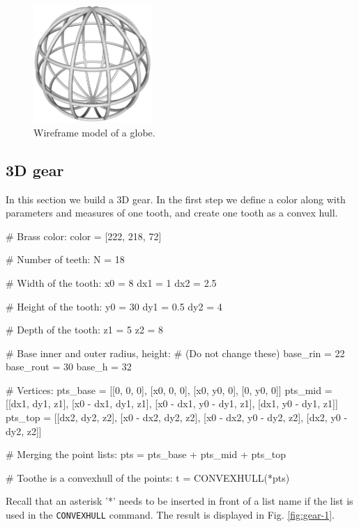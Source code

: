 \begin{figure}[!ht]
\begin{center}
\includegraphics[width=0.4\textwidth]{img/globe.png}
\end{center}
\vspace{-4mm}
\caption{Wireframe model of a globe.}
\label{fig:globe}
\vspace{-1cm}
\end{figure}

\newpage

\subsection{3D gear}

In this section we build a 3D gear. In the first step we define 
a color along with parameters and measures of one tooth, and
create one tooth as a convex hull.
{\small
\begin{bluecode}
# Brass color:
color = [222, 218, 72]

# Number of teeth:
N = 18

# Width of the tooth:
x0  = 8
dx1 = 1
dx2 = 2.5

# Height of the tooth:
y0  = 30
dy1 = 0.5
dy2 = 4

# Depth of the tooth:
z1 = 5
z2 = 8

# Base inner and outer radius, height:
# (Do not change these)
base_rin  = 22
base_rout = 30
base_h    = 32

# Vertices:
pts_base = [[0, 0, 0], [x0, 0, 0], [x0, y0, 0], [0, y0, 0]]
pts_mid  = [[dx1, dy1, z1], [x0 - dx1, dy1, z1], [x0 - dx1, y0 - dy1, z1], 
[dx1, y0 - dy1, z1]]
pts_top  = [[dx2, dy2, z2], [x0 - dx2, dy2, z2], [x0 - dx2, y0 - dy2, z2], 
[dx2, y0 - dy2, z2]]

# Merging the point lists:
pts = pts_base + pts_mid + pts_top

# Toothe is a convexhull of the points:
t = CONVEXHULL(*pts)
\end{bluecode}
}
\noindent
Recall that an asterisk '*' needs to be inserted in front of a list 
name if the list is used in the {\tt CONVEXHULL} command.
The result is displayed in Fig. \ref{fig:gear-1}.

